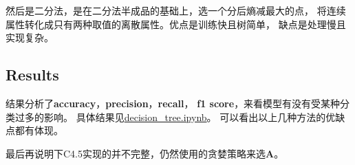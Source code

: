 \documentclass[a4paper, 11pt]{article}
\begin{document}
然后是二分法，是在二分法半成品的基础上，选一个分后熵减最大的点，
将连续属性转化成只有两种取值的离散属性。优点是训练快且树简单，
缺点是处理慢且实现复杂。

\subsection{Results}
结果分析了\textbf{accuracy}，\textbf{precision}，\textbf{recall}，
\textbf{f1 score}，来看模型有没有受某种分类过多的影响。
具体结果见\href{run:decision_tree.ipynb}{decision\_tree.ipynb}。
可以看出以上几种方法的优缺点都有体现。

最后再说明下C4.5实现的并不完整，仍然使用的贪婪策略来选\textbf{A}。

%
%
\end{document}
